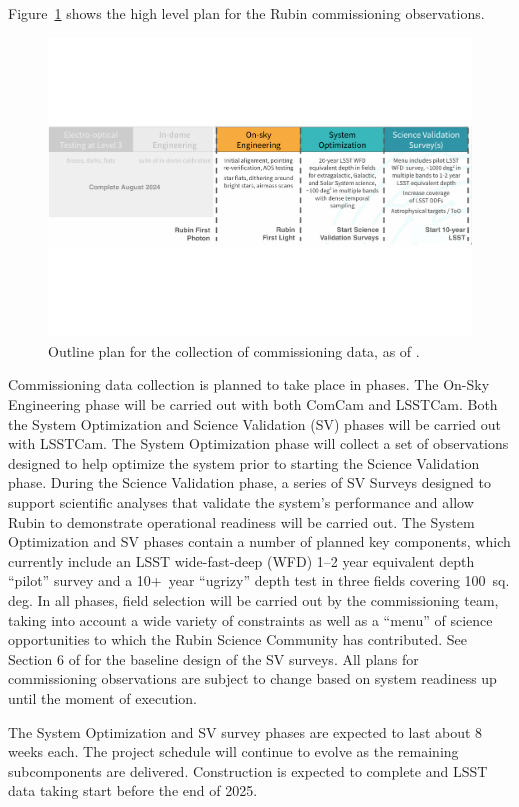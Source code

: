 Figure~\ref{fig:commissioning} shows the high level plan for the Rubin commissioning observations. 
\begin{figure}[htb]
\centering
\includegraphics[width=0.95\linewidth]{figures/commissioning-plan}
\caption{Outline plan for the collection of commissioning data, as of \currentdate.}
\label{fig:commissioning}
\end{figure}
Commissioning data collection is planned to take place in phases.
The On-Sky Engineering phase will be carried out with both ComCam and LSSTCam.
Both the System Optimization and Science Validation (SV) phases will be carried out with LSSTCam. 
The System Optimization phase will collect a set of observations designed to help optimize the system prior to starting the Science Validation phase.
During the Science Validation phase, a series of SV Surveys designed to support scientific analyses that validate the system's performance and allow Rubin to demonstrate operational readiness will be carried out.
The System Optimization and SV phases contain a number of planned key components, which currently include an LSST wide-fast-deep (WFD) 1--2 year equivalent depth ``pilot'' survey and a 
10+~year ``ugrizy'' depth test in three fields covering 100~sq. deg.
In all phases, field selection will be carried out by the commissioning team, taking into account a wide variety of constraints as well as a ``menu'' of science opportunities to which the Rubin Science Community has contributed.
See Section 6 of  for the baseline design of the SV surveys.
All plans for commissioning observations are subject to change based on system readiness up until the moment of execution. 

The System Optimization and SV survey phases are expected to last about 8 weeks each.
The project schedule will continue to evolve as the remaining subcomponents are delivered. 
Construction is expected to complete and LSST data taking start before the end of 2025.

